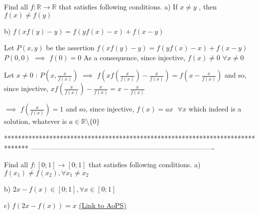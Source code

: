 \begin{solution}
	\begin{tcolorbox}Find all $ f: \mathbb{R}\rightarrow \mathbb{R} $   that satisfies following conditions.
a) If $x\neq y$ ,  then     $ f(x)\neq f(y)$

b) $f\left ( xf\left ( y \right ) -y\right )=f\left ( yf\left ( x \right )-x \right )+f(x-y)$\end{tcolorbox}
Let $P(x,y)$ be the assertion $f(xf(y)-y)=f(yf(x)-x)+f(x-y)$
$P(0,0)$ $\implies$ $f(0)=0$
As a consequence, since injective, $f(x)\ne 0$ $\forall x\ne 0$

Let $x\ne 0$ : $P(x,\frac x{f(x)})$ $\implies$ $f\left(xf(\frac x{f(x)})-\frac x{f(x)}\right)=f\left(x-\frac x{f(x)}\right)$ and so, since injective, $xf(\frac x{f(x)})-\frac x{f(x)}=x-\frac x{f(x)}$

$\implies$ $f(\frac x{f(x)})=1$ and so, since injective, $\boxed{f(x)=ax\text{  }\forall x}$ which indeed is a solution, whatever is $a\in\mathbb R\setminus\{0\}$
\end{solution}
*******************************************************************************
-------------------------------------------------------------------------------

\begin{problem}
	Find all $f:\left [ 0;1 \right ]\rightarrow \left [ 0;1 \right ]    $   that satisfies following conditions.
a) $f\left ( x_{1} \right )\neq f\left ( x_{2} \right ),\forall x_{1} \neq x_{2}$

b) $2x-f(x)\in \left [ 0;1 \right ],\forall x\in \left [ 0;1 \right ]$

c) $ f\left ( 2x-f\left ( x \right ) \right )=x$
	\flushright \href{https://artofproblemsolving.com/community/c6h618326}{(Link to AoPS)}
\end{problem}



